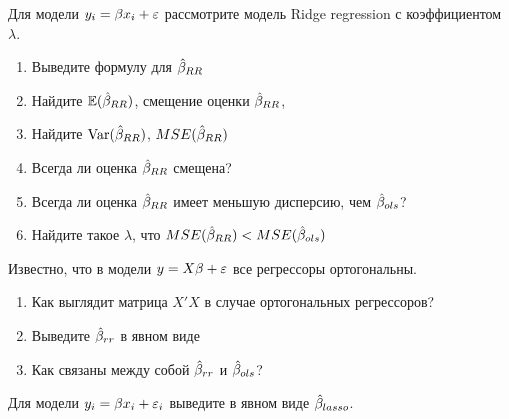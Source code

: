 \documentclass[pdftex,11pt,openany]{book}\usepackage[]{graphicx}\usepackage[]{color}
\begin{document}
\begin{problem}
Для модели $y_i=\beta x_i+\varepsilon$ рассмотрите модель Ridge regression с коэффициентом $\lambda$.
\begin{enumerate}
\item Выведите формулу для $\hat{\beta}_{RR}$
\item Найдите $\mathbb{E}(\hat{\beta}_{RR})$, смещение оценки $\hat{\beta}_{RR}$,
\item Найдите $\operatorname{Var}(\hat{\beta}_{RR})$, $MSE(\hat{\beta}_{RR})$
\item Всегда ли оценка $\hat{\beta}_{RR}$ смещена?
\item Всегда ли оценка $\hat{\beta}_{RR}$ имеет меньшую дисперсию, чем $\hat{\beta}_{ols}$?
\item Найдите такое $\lambda$, что $MSE(\hat{\beta}_{RR})<MSE(\hat{\beta}_{ols})$
\end{enumerate}
\end{problem}
\begin{solution}
\end{solution}



\begin{problem}
Известно, что в модели $y=X\beta+\varepsilon$ все регрессоры ортогональны. 
\begin{enumerate}
\item Как выглядит матрица $X'X$ в случае ортогональных регрессоров?
\item Выведите $\hat{\beta}_{rr}$ в явном виде
\item Как связаны между собой $\hat{\beta}_{rr}$ и $\hat{\beta}_{ols}$?
\end{enumerate}
\end{problem}
\begin{solution}
\end{solution}


\begin{problem}
Для модели $y_i=\beta x_i + \varepsilon_i$ выведите в явном виде $\hat{\beta}_{lasso}$. 
\end{problem}
\begin{solution}
\end{solution}
\end{document}
